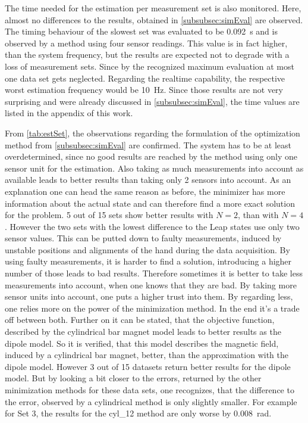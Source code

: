 The time needed for the estimation per measurement set is also monitored. Here, almost no differences to the results, obtained in \ref{subsubsec:simEval} are observed. The timing behaviour of the slowest set was evaluated to be \SI{0.092}{\second} and is observed by a method using four sensor readings. This value is in fact higher, than the system frequency, but the results are expected not to degrade with a loss of measurement sets. Since by the recognized maximum evaluation at most one data set gets neglected. Regarding the realtime capability, the respective worst estimation frequency would be \SI{10}{\Hz}. Since those results are not very surprising and were already discussed in \ref{subsubsec:simEval}, the time values are listed in the appendix of this work.

From \ref{tab:estSet}, the observations regarding the formulation of the optimization method from \ref{subsubsec:simEval} are confirmed. The system has to be at least overdetermined, since no good results are reached by the method using only one sensor unit for the estimation. Also taking as much measurements into account as available leads to better results than taking only 2 sensors into account. As an explanation one can head the same reason as before, the minimizer has more information about the actual state and can therefore find a more exact solution for the problem. 5 out of 15 sets show better results with $ N = 2 $, than with $ N = 4 $. However the two sets with the lowest difference to the Leap states use only two sensor values. This can be putted down to faulty measurements, induced by unstable positions and alignments of the hand during the data acquisition. By using faulty measurements, it is harder to find a solution, introducing a higher number of those leads to bad results. Therefore sometimes it is better to take less measurements into account, when one knows that they are bad. By taking more sensor units into account, one puts a higher trust into them. By regarding less, one relies more on the power of the minimization method. In the end it's a trade off between both.
Further on it can be stated, that the objective function, described by the cylindrical bar magnet model leads to better results as the dipole model. So it is  verified, that this model describes the magnetic field, induced by a cylindrical bar magnet, better, than the approximation with the dipole model. However 3 out of 15 datasets return better results for the dipole model. But by looking a bit closer to the errors, returned by the other minimization methods for these data sets, one recognizes, that the difference to the error, observed by a cylindrical method is only slightly smaller. For example for Set 3, the results for the cyl\_12 method are only worse by \SI{0.008}{\radian}. 
